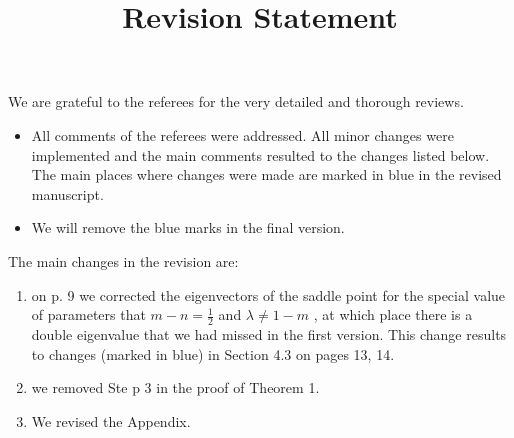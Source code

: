 \documentclass[a4paper,11pt]{article}
\begin{document}
\title{Revision Statement}

\maketitle

We are grateful to the referees for the very detailed and thorough reviews. 
\begin{itemize}
 \item All comments of the referees were addressed.  All minor changes were implemented 
 and the main comments resulted to the changes listed below.
 The main  places where changes were made are marked in blue in the revised manuscript.
 
 
 
 \item We will remove the blue marks in the final version.
\end{itemize}
\medskip

 The main changes in the revision are:


\begin{enumerate} 
 \item on p. 9 we corrected the eigenvectors of the saddle point for the special value of parameters that $m-n= \frac{1}{2}$ and $\lambda\ne1-m$ ,
 at which place there is a double eigenvalue that we had missed in the first version.
 This change results to changes (marked in blue) in Section 4.3 on pages 13, 14.
 
 \item we removed Ste p 3 in the proof of Theorem 1.
 
 \item We revised the Appendix.


\end{enumerate}
\end{document}
